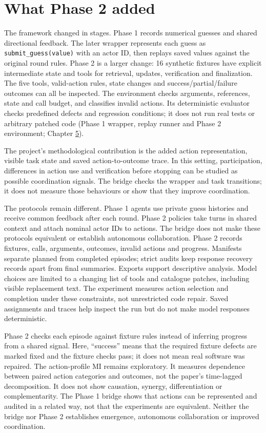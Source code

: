 \documentclass[12pt,a4paper,oneside]{report}
\begin{document}
\section{What Phase 2 added}
The framework changed in stages. Phase 1 records numerical guesses and shared directional feedback. The later wrapper represents each guess as \texttt{submit\allowbreak\_guess(value)} with an actor ID, then replays saved values against the original round rules. Phase 2 is a larger change: 16 synthetic fixtures have explicit intermediate state and tools for retrieval, updates, verification and finalization. The five tools, valid-action rules, state changes and success/partial/failure outcomes can all be inspected. The environment checks arguments, references, state and call budget, and classifies invalid actions. Its deterministic evaluator checks predefined defects and regression conditions; it does not run real tests or arbitrary patched code (Phase 1 wrapper, replay runner and Phase 2 environment; Chapter \hyperref[chapter-05]{5}).

The project’s methodological contribution is the added action representation, visible task state and saved action-to-outcome trace. In this setting, participation, differences in action use and verification before stopping can be studied as possible coordination signals. The bridge checks the wrapper and task transitions; it does not measure those behaviours or show that they improve coordination.

The protocols remain different. Phase 1 agents use private guess histories and receive common feedback after each round. Phase 2 policies take turns in shared context and attach nominal actor IDs to actions. The bridge does not make these protocols equivalent or establish autonomous collaboration. Phase 2 records fixtures, calls, arguments, outcomes, invalid actions and progress. Manifests separate planned from completed episodes; strict audits keep response recovery records apart from final summaries. Exports support descriptive analysis. Model choices are limited to a changing list of tools and catalogue patches, including visible replacement text. The experiment measures action selection and completion under these constraints, not unrestricted code repair. Saved assignments and traces help inspect the run but do not make model responses deterministic.

Phase 2 checks each episode against fixture rules instead of inferring progress from a shared signal. Here, “success” means that the required fixture defects are marked fixed and the fixture checks pass; it does not mean real software was repaired. The action-profile MI remains exploratory. It measures dependence between paired action categories and outcomes, not the paper’s time-lagged decomposition. It does not show causation, synergy, differentiation or complementarity. The Phase 1 bridge shows that actions can be represented and audited in a related way, not that the experiments are equivalent. Neither the bridge nor Phase 2 establishes emergence, autonomous collaboration or improved coordination.
\end{document}
